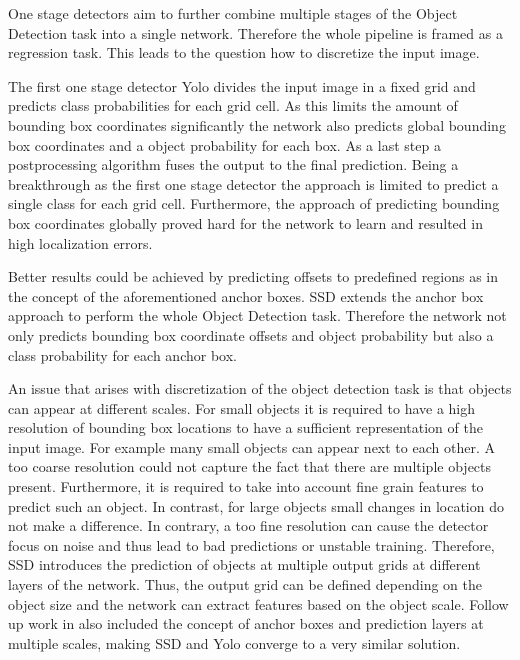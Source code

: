 One stage detectors aim to further combine multiple stages of the Object Detection task into a single network. Therefore the whole pipeline is framed as a regression task. This leads to the question how to discretize the input image. 

The first one stage detector \ac{Yolo}\cite{Redmon} divides the input image in a fixed grid and predicts class probabilities for each grid cell. As this limits the amount of bounding box coordinates significantly the network also predicts global bounding box coordinates and a object probability for each box. As a last step a postprocessing algorithm fuses the output to the final prediction. Being a breakthrough as the first one stage detector the approach is limited to predict a single class for each grid cell. Furthermore, the approach of predicting bounding box coordinates globally proved hard for the network to learn and resulted in high localization errors.

Better results could be achieved by predicting offsets to predefined regions as in the concept of the aforementioned anchor boxes. \ac{SSD} \cite{Liu} extends the anchor box approach to perform the whole Object Detection task. Therefore the network not only predicts bounding box coordinate offsets and object probability but also a class probability for each anchor box. 

An issue that arises with discretization of the object detection task is that objects can appear at different scales. For small objects it is required to have a high resolution of bounding box locations to have a sufficient representation of the input image. For example many small objects can appear next to each other. A too coarse resolution could not capture the fact that there are multiple objects present. Furthermore, it is required to take into account fine grain features to predict such an object. In contrast, for large objects small changes in location do not make a difference. In contrary, a too fine resolution can cause the detector focus on noise and thus lead to bad predictions or unstable training. Therefore, \ac{SSD} introduces the prediction of objects at multiple output grids at different layers of the network. Thus, the output grid can be defined depending on the object size and the network can extract features based on the object scale. Follow up work in \cite{Redmon, Redmona} also included the concept of anchor boxes and prediction layers at multiple scales, making \ac{SSD} and \ac{Yolo} converge to a very similar solution.

